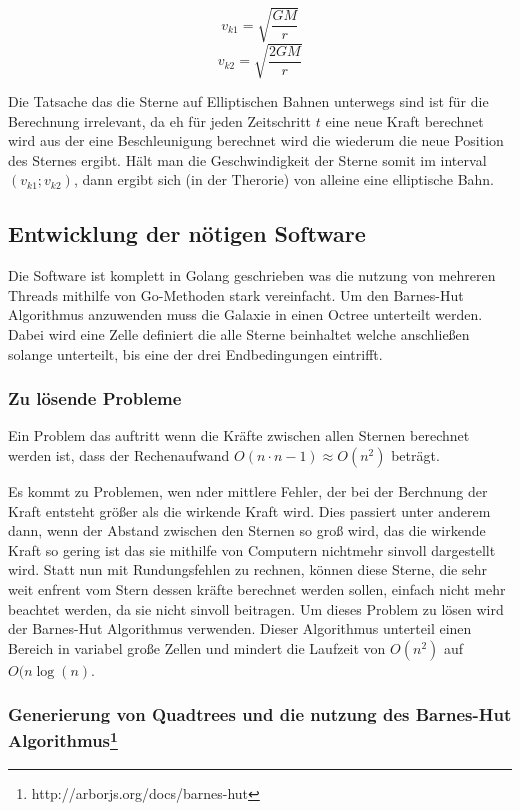 \begin{equation}
v_{k1} = \sqrt{\frac{GM}{r}}
\end{equation}
\begin{equation}
v_{k2} = \sqrt{\frac{2GM}{r}}
\end{equation}

Die Tatsache das die Sterne auf Elliptischen Bahnen unterwegs sind ist für die
Berechnung irrelevant, da eh für jeden Zeitschritt \( t \) eine neue Kraft
berechnet wird aus der eine Beschleunigung berechnet wird die wiederum die neue
Position des Sternes ergibt.  Hält man die Geschwindigkeit der Sterne somit im
interval \( (v_{k1} ; v_{k2}) \), dann ergibt sich (in der Therorie) von
alleine eine elliptische Bahn.

\subsection{Entwicklung der nötigen Software}
Die Software ist komplett in Golang geschrieben was die nutzung von mehreren
Threads mithilfe von Go-Methoden stark vereinfacht. Um den Barnes-Hut
Algorithmus anzuwenden muss die Galaxie in einen Octree unterteilt werden.
Dabei wird eine Zelle definiert die alle Sterne beinhaltet welche anschließen
solange unterteilt, bis eine der drei Endbedingungen eintrifft.

\subsubsection{Zu lösende Probleme}
Ein Problem das auftritt wenn die Kräfte zwischen allen Sternen berechnet
werden ist, dass der Rechenaufwand \( O(n \cdot n-1) \approx O(n^2) \) beträgt.

Es kommt zu Problemen, wen nder mittlere Fehler, der bei der Berchnung der Kraft
entsteht größer als die wirkende Kraft wird. Dies passiert unter anderem dann,
wenn der Abstand zwischen den Sternen so groß wird, das die wirkende Kraft so gering ist
das sie mithilfe von Computern nichtmehr sinvoll dargestellt wird.
Statt nun mit Rundungsfehlen zu rechnen, können diese Sterne, die sehr weit enfrent vom
Stern dessen kräfte berechnet werden sollen, einfach nicht mehr beachtet werden,
da sie nicht sinvoll beitragen.
Um dieses Problem zu lösen wird der Barnes-Hut Algorithmus verwenden. Dieser Algorithmus
unterteil einen Bereich in variabel große Zellen und mindert die Laufzeit von \( O(n^2) \) auf
\( O(n \log(n) \).

\subsubsection{Generierung von Quadtrees und die nutzung des Barnes-Hut
Algorithmus\footnote{http://arborjs.org/docs/barnes-hut}}


